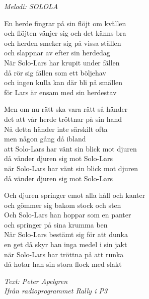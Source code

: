 {\footnotesize\textit{Melodi: SOLOLA}}\par
\vspace{8pt}
En herde fingrar på sin flöjt om kvällen\\
och flöjten vänjer sig och det känns bra\\
och herden smeker sig på vissa ställen\\
och slappnar av efter sin herdedag\\
När Solo-Lars har krupit under fällen\\
då rör sig fällen som ett böljehav\\
och ingen kulla kan där bli på smällen\\
för Lars är ensam med sin herdestav\par
\vspace{8pt}
Men om nu rätt ska vara rätt så händer\\
det att vår herde tröttnar på sin hand\\
Nå detta händer inte särskilt ofta\\
men någon gång då ibland \\
att Solo-Lars har vänt sin blick mot djuren\\
då vänder djuren sig mot Solo-Lars \\
när Solo-Lars har vänt sin blick mot djuren\\
då vänder djuren sig mot Solo-Lars\par
\vspace{8pt}
Och djuren springer emot alla håll och kanter\\
och gömmer sig bakom stock och sten\\
Och Solo-Lars han hoppar som en panter\\
och springer på sina krumma ben \\
När Solo-Lars bestämt sig för att dunka\\
en get då skyr han inga medel i sin jakt\\
när Solo-Lars har tröttna på att runka\\
då hotar han sin stora flock med slakt\par
\vspace{10pt}
{\footnotesize\textit{Text: Peter Apelgren\\Ifrån radioprogrammet Rally i P3}}
